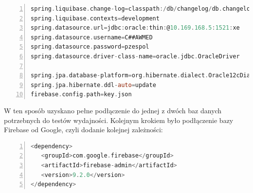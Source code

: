 \begin{lstlisting}[language=C, mathescape, frame=single, numbers=left, xleftmargin=2em, framexleftmargin=2em, basicstyle=\ttfamily\bfseries, caption={Konfiguracja application.properties}, label={Konfiguracja application.properties}]
spring.liquibase.change-log=classpath:/db/changelog/db.changelog-master.xml
spring.liquibase.contexts=development
spring.datasource.url=jdbc:oracle:thin:@10.169.168.5:1521:xe
spring.datasource.username=C##AWMED
spring.datasource.password=pzespol
spring.datasource.driver-class-name=oracle.jdbc.OracleDriver

spring.jpa.database-platform=org.hibernate.dialect.Oracle12cDialect
spring.jpa.hibernate.ddl-auto=update
firebase.config.path=key.json
\end{lstlisting}

W ten sposób uzyskano pełne podłączenie do jednej z dwóch baz danych potrzebnych do testów wydajności. Kolejnym krokiem było podłączenie bazy Firebase od Google, czyli dodanie kolejnej zależności:

\begin{lstlisting}[language=C, mathescape, frame=single, numbers=left, xleftmargin=2em, framexleftmargin=2em, basicstyle=\ttfamily\bfseries, caption={Zależności dla Firebase}, label={Zależności dla Firebase}]
<dependency>
   <groupId>com.google.firebase</groupId>
   <artifactId>firebase-admin</artifactId>
   <version>9.2.0</version>
</dependency>
\end{lstlisting}


